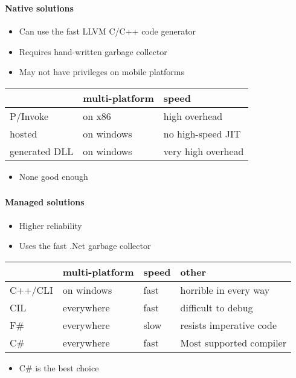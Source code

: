 \begin{frame}
    \frametitle{\subsecname}
    \framesubtitle{Native solutions}

    \begin{itemize}
        \item Can use the fast LLVM C/C++ code generator
        \item Requires hand-written garbage collector
        \item May not have privileges on mobile platforms
    \end{itemize}

    \begin{tabular}{l|l|l}
        & multi-platform & speed \\
        \hline
        P/Invoke      & on x86     & high overhead \\
        hosted        & on windows & no high-speed JIT \\
        generated DLL & on windows & very high overhead \\
    \end{tabular}

    \begin{itemize}
        \item None good enough
    \end{itemize}
\end{frame}

\begin{frame}
    \frametitle{\subsecname}
    \framesubtitle{Managed solutions}

    \begin{itemize}
        \item Higher reliability
        \item Uses the fast .Net garbage collector
    \end{itemize}

    \begin{tabular}{l|l|l|l}
        & multi-platform & speed & other\\
        \hline
        C++/CLI & on windows & fast & horrible in every way\\
        CIL     & everywhere & fast & difficult to debug\\
        F\#     & everywhere & slow & resists imperative code\\
        C\#     & everywhere & fast & Most supported compiler\\
    \end{tabular}

    \begin{itemize}
        \item C\# is the best choice
    \end{itemize}
\end{frame}

